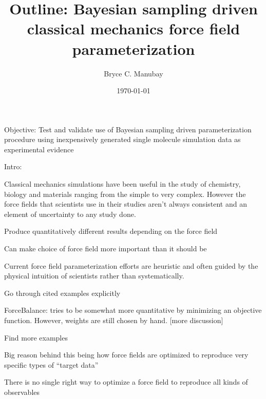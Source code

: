 \documentclass{report}
\title{Outline: Bayesian sampling driven classical mechanics force field parameterization}
\author{Bryce C. Manubay}
\date{\today}
\begin{document}
{\let\newpage\relax\maketitle}
\begin{outline}
  \item{Objective: Test and validate use of Bayesian sampling driven parameterization procedure using inexpensively generated single molecule simulation data 
        as experimental evidence}
  \item{Intro:}
  \begin{outline}
    \item{Classical mechanics simulations have been useful in the study of chemistry, biology and materials ranging from the simple to very complex. However 
          the force fields that scientists use in their studies aren’t always consistent and an element of uncertainty to any study done.}
    \begin{outline}
      \item{Produce quantitatively different results depending on the force field \cite{ffcomp1,ffcomp2,ewen_comparison_2016,petrov_are_2014,
            guvench_comparison_2008}}            
      \item{Can make choice of force field more important than it should be}
    \end{outline}
    \item{Current force field parameterization efforts are heuristic and often guided by the physical intuition of scientists rather than systematically.
          \cite{parm94,tip3p,tip4pew,burger,law,combined,rational,aipar}
    \begin{outline}
      \item{Go through cited examples explicitly}
      \item{ForceBalance: tries to be somewhat more quantitative by minimizing an objective function.  However, weights are still chosen by hand. 
            [more discussion]\cite{FB1,FB2,FB3}}
      \item{Find more examples}
    \end{outline}
    \item{Big reason behind this being how force fields are optimized to reproduce very specific types of “target data”\cite{unchanged,monticelli}}
    \begin{outline}
      \item{There is no single right way to optimize a force field to reproduce all kinds of observables}
      \begin{outline}

\end{outline}
\end{outline}}
\end{outline}
\end{outline}
\end{document}
